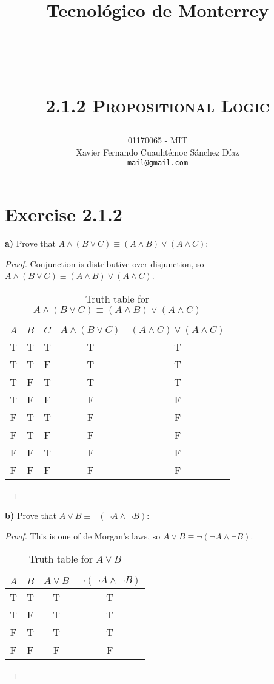 \documentclass[titlepage, letterpaper, fleqn]{article}
\title{
\vspace{1in}
\textbf{Tecnológico de Monterrey} \\
\vspace{0.5in}
\textmd{\mahclass} \\
\large{\textit{\mahteacher}} \\
\vspace{0.5in}
\textsc{\mahtitle}\\
\textsc{2.1.2 Propositional Logic}\\
\author{01170065  - MIT \\
Xavier Fernando Cuauhtémoc Sánchez Díaz \\
\texttt{mail@gmail.com}}
\date{\mahdate}
}
\begin{document}
\begin{titlepage}
\maketitle
\end{titlepage}

%
%

\section{Exercise 2.1.2}

{\large \textbf{a)} Prove that \(A \wedge (B \vee C) \equiv (A \wedge B) \vee (A \wedge C)\):}

\begin{proof}
Conjunction is distributive over disjunction, so \(A \wedge (B \vee C) \equiv (A \wedge B) \vee (A \wedge C)\).

\begin{table}[h!]
\centering
\begin{tabular}{@{}ccccc@{}}
\toprule
\multicolumn{1}{l}{$A$} & \multicolumn{1}{l}{$B$} & \multicolumn{1}{l}{$C$} & \multicolumn{1}{l}{$A \wedge (B \vee C)$} & \multicolumn{1}{l}{$(A \wedge C) \vee (A \wedge C)$} \\ \midrule
T & T & T & T & T \\
T & T & F & T & T \\
T & F & T & T & T \\
T & F & F & F & F \\
F & T & T & F & F \\
F & T & F & F & F \\
F & F & T & F & F \\
F & F & F & F & F \\ \bottomrule
\end{tabular}
\caption{Truth table for \(A \wedge (B \vee C) \equiv (A \wedge B) \vee (A \wedge C)\)}
\label{fig:a}
\end{table}
\end{proof}

{\large \textbf{b)} Prove that \(A \vee B \equiv \neg(\neg A \wedge \neg B)\):}

\begin{proof}
This is one of de Morgan's laws, so \(A \vee B \equiv \neg(\neg A \wedge \neg B)\).

\begin{table}[h!]
\centering
\begin{tabular}{@{}cccc@{}}
\toprule
\multicolumn{1}{l}{$A$} & \multicolumn{1}{l}{$B$} & \multicolumn{1}{l}{$A \vee B$} & \multicolumn{1}{l}{$\neg (\neg A \wedge \neg B)$} \\ \midrule
T & T & T & T \\
T & F & T & T \\
F & T & T & T \\
F & F & F & F \\ \bottomrule
\end{tabular}
\caption{Truth table for \(A \vee B\)}
\label{fig:b}
\end{table}
\end{proof}
\end{document}
